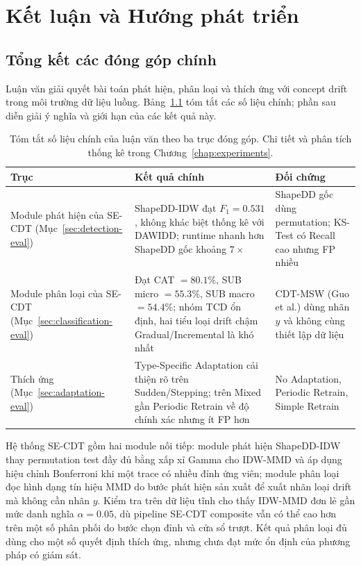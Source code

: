 \chapter{Kết luận và Hướng phát triển}
\label{chap:conclusion}

\section{Tổng kết các đóng góp chính}

Luận văn giải quyết bài toán phát hiện, phân loại và thích ứng với concept drift trong môi trường dữ liệu luồng. Bảng~\ref{tab:contribution-summary} tóm tắt các số liệu chính; phần sau diễn giải ý nghĩa và giới hạn của các kết quả này.

\begin{table}[H]
	\centering
	\caption{Tóm tắt số liệu chính của luận văn theo ba trục đóng góp. Chi tiết và phân tích thống kê trong Chương~\ref{chap:experiments}.}
	\label{tab:contribution-summary}
	\small
	\begin{tabular}{p{}p{}p{}}
		\toprule
		Trục & Kết quả chính & Đối chứng \\
		\midrule
		Module phát hiện của SE-CDT (Mục~\ref{sec:detection-eval}) & ShapeDD-IDW đạt $F_1 = 0.531$, không khác biệt thống kê với DAWIDD; runtime nhanh hơn ShapeDD gốc khoảng $7\times$ & ShapeDD gốc dùng permutation; KS-Test có Recall cao nhưng FP nhiều \\
		Module phân loại của SE-CDT (Mục~\ref{sec:classification-eval}) & Đạt CAT $=80.1\%$, SUB micro $=55.3\%$, SUB macro $=54.4\%$; nhóm TCD ổn định, hai tiểu loại drift chậm Gradual/Incremental là khó nhất & CDT-MSW (Guo et al.) dùng nhãn $y$ và không cùng thiết lập dữ liệu \\
		Thích ứng (Mục~\ref{sec:adaptation-eval}) & Type-Specific Adaptation cải thiện rõ trên Sudden/Stepping; trên Mixed gần Periodic Retrain về độ chính xác nhưng ít FP hơn & No Adaptation, Periodic Retrain, Simple Retrain \\
		\bottomrule
	\end{tabular}
\end{table}

Hệ thống SE-CDT gồm hai module nối tiếp: module phát hiện ShapeDD-IDW thay permutation test đầy đủ bằng xấp xỉ Gamma cho IDW-MMD và áp dụng hiệu chỉnh Bonferroni khi một trace có nhiều đỉnh ứng viên; module phân loại đọc hình dạng tín hiệu MMD do bước phát hiện sản xuất để xuất nhãn loại drift mà không cần nhãn $y$. Kiểm tra trên dữ liệu tĩnh cho thấy IDW-MMD đơn lẻ gần mức danh nghĩa $\alpha = 0.05$, dù pipeline SE-CDT composite vẫn có thể cao hơn trên một số phân phối do bước chọn đỉnh và cửa sổ trượt. Kết quả phân loại đủ dùng cho một số quyết định thích ứng, nhưng chưa đạt mức ổn định của phương pháp có giám sát.

